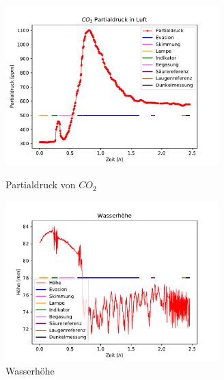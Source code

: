 \documentclass[12pt]{article}
\begin{document}
\begin{figure}[H]
	\parbox{82.5mm}{
		\centering
		\includegraphics[width=82.5mm]{VE-Wasser/Partialdruck}
		\caption{Partialdruck von $CO_2$}
	}
	\centering
	\parbox{82.5mm}{
		\centering
		\includegraphics[width=82.5mm]{VE-Wasser/Wasserhoehe}
		\caption{Wasserh\"ohe }
	}
	\hfill%
	\parbox{82.5mm}{
		\centering
	}
\end{figure}
\end{document}
